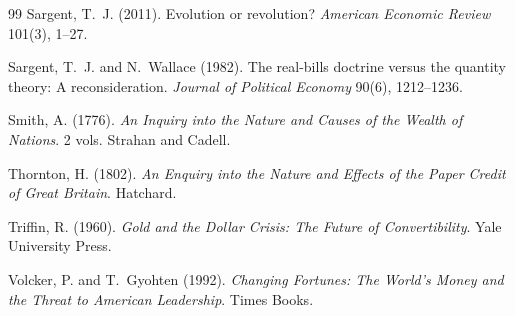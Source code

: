 \documentclass[12pt]{article}
\begin{document}
\begin{thebibliography}{99}
Sargent, T.~J. (2011).
\newblock Evolution or revolution?
\newblock \textit{American Economic Review} 101(3), 1--27.

Sargent, T.~J. and N.~Wallace (1982).
\newblock The real-bills doctrine versus the quantity theory: A
  reconsideration.
\newblock \textit{Journal of Political Economy} 90(6), 1212--1236.

Smith, A. (1776).
\newblock \textit{An Inquiry into the Nature and Causes of the Wealth of
  Nations}. 2 vols.
\newblock Strahan and Cadell.

Thornton, H. (1802).
\newblock \textit{An Enquiry into the Nature and Effects of the Paper Credit of
  Great Britain}.
\newblock Hatchard.

Triffin, R. (1960).
\newblock \textit{Gold and the Dollar Crisis: The Future of Convertibility}.
\newblock Yale University Press.

Volcker, P. and T.~Gyohten (1992).
\newblock \textit{Changing Fortunes: The World's Money and the Threat to
  American Leadership}.
\newblock Times Books.

\end{thebibliography}
\end{document}
